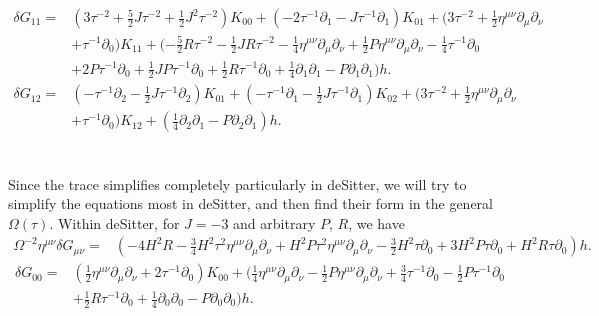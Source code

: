 \documentclass[10pt,letterpaper]{article}
\begin{document}
\begin{align}
\delta G_{11}={}&(3 \tau^{-2}
 + \tfrac{5}{2} J \tau^{-2}
 + \tfrac{1}{2} J^2 \tau^{-2}) K_{00}
 + (-2 \tau^{-1} \partial_{1}
 -  J \tau^{-1} \partial_{1}) K_{01}
 + (3 \tau^{-2}
 + \tfrac{1}{2} \eta^{\mu \nu} \partial_{\mu} \partial_{\nu}\nonumber\\
& + \tau^{-1} \partial_{0}) K_{11}
 + (- \tfrac{5}{2} R \tau^{-2}
 -  \tfrac{1}{2} J R \tau^{-2}
 -  \tfrac{1}{4} \eta^{\mu \nu} \partial_{\mu} \partial_{\nu}
 + \tfrac{1}{2} P \eta^{\mu \nu} \partial_{\mu} \partial_{\nu}
 -  \tfrac{1}{4} \tau^{-1} \partial_{0}\nonumber\\
& + 2 P \tau^{-1} \partial_{0}
 + \tfrac{1}{2} J P \tau^{-1} \partial_{0}
 + \tfrac{1}{2} R \tau^{-1} \partial_{0}
 + \tfrac{1}{4} \partial_{1} \partial_{1}
 -  P \partial_{1} \partial_{1}) h.
\end{align}
\begin{align}
\delta G_{12}={}&(- \tau^{-1} \partial_{2}
 -  \tfrac{1}{2} J \tau^{-1} \partial_{2}) K_{01}
 + (- \tau^{-1} \partial_{1}
 -  \tfrac{1}{2} J \tau^{-1} \partial_{1}) K_{02}
 + (3 \tau^{-2}
 + \tfrac{1}{2} \eta^{\mu \nu} \partial_{\mu} \partial_{\nu}\nonumber\\
& + \tau^{-1} \partial_{0}) K_{12}
 + (\tfrac{1}{4} \partial_{2} \partial_{1}
 -  P \partial_{2} \partial_{1}) h.
\end{align}
\\ \\
Since the trace simplifies completely particularly in deSitter, we will try to simplify the equations most in deSitter, and then find their form in the general $\Omega(\tau)$. Within deSitter, for $J=-3$ and arbitrary $P$, $R$, we have
\begin{align}
\Omega^{-2}\eta^{\mu\nu}\delta G_{\mu\nu}={}&(-4 H^2 R
 -  \tfrac{3}{4} H^2 \tau^2 \eta^{\mu \nu} \partial_{\mu} \partial_{\nu}
 + H^2 P \tau^2 \eta^{\mu \nu} \partial_{\mu} \partial_{\nu}
 -  \tfrac{3}{2} H^2 \tau \partial_{0}
 + 3 H^2 P \tau \partial_{0}
 + H^2 R \tau \partial_{0}) h.
\end{align}
\begin{align}
\delta G_{00}={}&(\tfrac{1}{2} \eta^{\mu \nu} \partial_{\mu} \partial_{\nu}
 + 2 \tau^{-1} \partial_{0}) K_{00}
 + (\tfrac{1}{4} \eta^{\mu \nu} \partial_{\mu} \partial_{\nu}
 -  \tfrac{1}{2} P \eta^{\mu \nu} \partial_{\mu} \partial_{\nu}
 + \tfrac{3}{4} \tau^{-1} \partial_{0}
 -  \tfrac{1}{2} P \tau^{-1} \partial_{0}\nonumber\\
& + \tfrac{1}{2} R \tau^{-1} \partial_{0}
 + \tfrac{1}{4} \partial_{0} \partial_{0}
 -  P \partial_{0} \partial_{0}) h.
\end{align}
\end{document}
